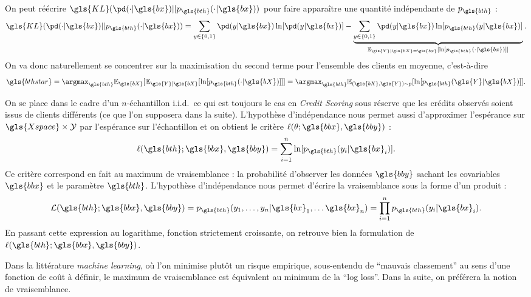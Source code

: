 On peut réécrire $\gls{KL}(\pd(\cdot|\gls{bx})||p_{\gls{bth}}(\cdot|\gls{bx}))$ pour faire apparaître une quantité indépendante de $p_{\gls{bth}}$ :
\[ \gls{KL}(\pd(\cdot|\gls{bx})||p_{\gls{bth}}(\cdot|\gls{bx})) = \sum_{y \in \{0,1\}} \pd(y|\gls{bx}) \ln [\pd(y|\gls{bx})] - \underbrace{\sum_{y \in \{0,1\}} \pd(y|\gls{bx}) \ln [p_{\gls{bth}}(y|\gls{bx})]}_{\mathbb{E}_{\gls{Y} | \gls{bX} = \gls{bx}} [\ln[p_{\gls{bth}}(\cdot|\gls{bx})]]}.  \]
On va donc naturellement se concentrer sur la maximisation du second terme pour l'ensemble des clients en moyenne, c'est-à-dire 
\[\gls{bthstar} = \argmax_{\gls{bth}} \mathbb{E}_{\gls{bX}}  [\mathbb{E}_{\gls{Y} | \gls{bX}} [\ln[p_{\gls{bth}}(\cdot|\gls{bX})]]] = \argmax_{\gls{bth}} \mathbb{E}_{(\gls{bX},\gls{Y}) \sim p} [\ln[p_{\gls{bth}}(\gls{Y} | \gls{bX})]].\]

On se place dans le cadre d'un $n$-échantillon i.i.d.\ ce qui est toujours le cas en \textit{Credit Scoring} sous réserve que les crédits observés soient issus de clients différents (ce que l'on supposera dans la suite). L'hypothèse d'indépendance nous permet aussi d'approximer l'espérance sur $\gls{Xspace} \times \mathcal{Y}$ par l'espérance sur l'échantillon et on obtient le critère $\ell(\theta;\gls{bbx},\gls{bby})$ :
\begin{equation} \label{eq:vraisemblance}
\ell(\gls{bth};\gls{bbx},\gls{bby}) = \sum_{i=1}^n \ln[p_{\gls{bth}}(y_i | \gls{bx}_i) ].
\end{equation}
Ce critère correspond en fait au maximum de vraisemblance : la probabilité d'observer les données $\gls{bby}$ sachant les covariables $\gls{bbx}$ et le paramètre $\gls{bth}$. L'hypothèse d'indépendance nous permet d'écrire la vraisemblance sous la forme d'un produit : $$\mathcal{L}(\gls{bth};\gls{bbx},\gls{bby}) = p_{\gls{bth}}(y_1,\dots,y_n | \gls{bx}_1,\dots \gls{bx}_n) = \prod_{i=1}^n p_{\gls{bth}}(y_i | \gls{bx}_i).$$ En passant cette expression au logarithme, fonction strictement croissante, on retrouve bien la formulation de $\ell(\gls{bth};\gls{bbx},\gls{bby})$.

Dans la littérature \textit{machine learning}, où l'on minimise plutôt un risque empirique, sous-entendu de ``mauvais classement'' au sens d'une fonction de coût à définir, le maximum de vraisemblance est équivalent au minimum de la ``log loss''. Dans la suite, on préférera la notion de vraisemblance.

